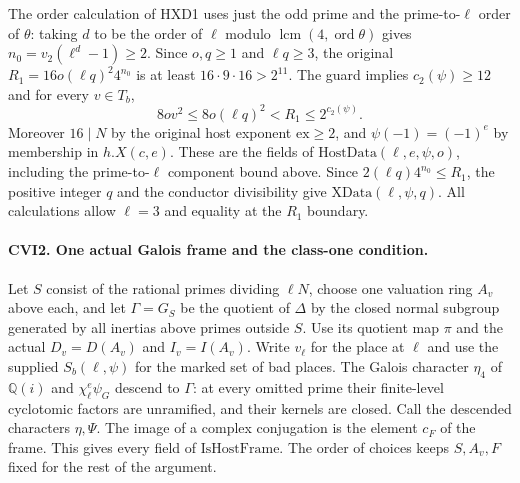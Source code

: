 The order calculation of HXD1 uses just the odd prime and the prime-to-$\ell$ order of $\theta$: taking $d$ to be the order of $\ell$ modulo $\operatorname{lcm}(4,\operatorname{ord}\theta)$ gives $n_0=v_2(\ell^d-1)\ge2$. Since $o,q\ge1$ and
$\ell q\ge3$, the original $R_1=16o(\ell q)^2 4^{n_0}$ is at least
$16\cdot9\cdot16>2^{11}$. The guard implies $c_2(\psi)\ge12$
and for every $v\in T_b$,
\[
 8o v^2\le8o(\ell q)^2<R_1\le2^{c_2(\psi)} .
\]
Moreover $16\mid N$ by the original host exponent $\mathrm{ex}\ge2$,
and $\psi(-1)=(-1)^e$ by membership in $h.X(c,e)$. These are the
fields of $\mathrm{HostData}(\ell,e,\psi,o)$, including the
prime-to-$\ell$ component bound above. Since
$2(\ell q)4^{n_0}\le R_1$, the positive integer $q$ and the
conductor divisibility give $\mathrm{XData}(\ell,\psi,q)$.
All calculations allow $\ell=3$ and equality at the $R_1$ boundary.

\paragraph{CVI2. One actual Galois frame and the class-one condition.}
\label{claim:CVI2}
Let $S$ consist of the rational primes dividing $\ell N$, choose
one valuation ring $A_v$ above each, and let $\Gamma=G_S$ be the
quotient of $\Delta$ by the closed normal subgroup generated by all
inertias above primes outside $S$. Use its quotient map $\pi$ and
the actual $D_v=D(A_v)$ and $I_v=I(A_v)$. Write $v_\ell$ for the
place at $\ell$ and use the supplied $S_b(\ell,\psi)$ for the marked
set of bad places. The Galois character $\eta_4$ of $\mathbb Q(i)$
and $\chi_\ell^e\psi_G$ descend to $\Gamma$: at every omitted
prime their finite-level cyclotomic factors are unramified, and their
kernels are closed. Call the descended characters $\eta,\Psi$.
The image of a complex conjugation is the element $c_F$ of the frame.
This gives every field of $\mathrm{IsHostFrame}$. The order of choices
keeps $S,A_v,F$ fixed for the rest of the argument.

